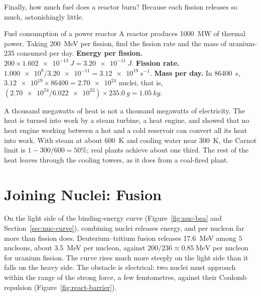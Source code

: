 Finally, how much fuel does a reactor burn? Because each fission releases so much, astonishingly little.

\begin{exbox}{Fuel consumption of a power reactor}\label{ex:react-fuel}
A reactor produces \SI{1000}{MW} of thermal power. Taking \SI{200}{\MeV} per fission, find the fission
rate and the mass of uranium-235 consumed per day.
 \textbf{Energy per fission.} $200\times\SI{1.602e-13}{J}=\SI{3.20e-11}{J}$.
 \textbf{Fission rate.} $\num{1.000e9}/\num{3.20e-11}=\SI{3.12e19}{s^{-1}}$.
 \textbf{Mass per day.} In \SI{86400}{s}, $\num{3.12e19}\times\num{86400}=\num{2.70e24}$ nuclei,
that is, $(\num{2.70e24}/\num{6.022e23})\times\SI{235.0}{g}=\SI{1.05}{kg}$.
\end{exbox}

A thousand megawatts of heat is not a thousand megawatts of electricity. The heat is turned into work by a
steam turbine, a heat engine, and  showed that no heat engine working between a hot and a
cold reservoir can convert all its heat into work. With steam at about \SI{600}{K} and cooling water near
\SI{300}{K}, the Carnot limit is $1-300/600=50\%$; real plants achieve about one third. The rest of the
heat leaves through the cooling towers, as it does from a coal-fired plant.

\section{Joining Nuclei: Fusion}\label{sec:react-fusion}

On the light side of the binding-energy curve (Figure~\ref{fig:nuc-bea} and Section~\ref{sec:nuc-curve}), combining nuclei releases energy, and
per nucleon far more than fission does. Deuterium--tritium fusion releases \SI{17.6}{\MeV} among $5$
nucleons, about \SI{3.5}{\MeV} per nucleon, against $200/236\approx\SI{0.85}{\MeV}$ per nucleon for
uranium fission. The curve rises much more steeply on the light side than it falls on the heavy side. The
obstacle is electrical: two nuclei must approach within the range of the strong force, a few
femtometres, against their Coulomb repulsion (Figure~\ref{fig:react-barrier}).

\begin{figure}[htbp]\centering
{}
\end{figure}

